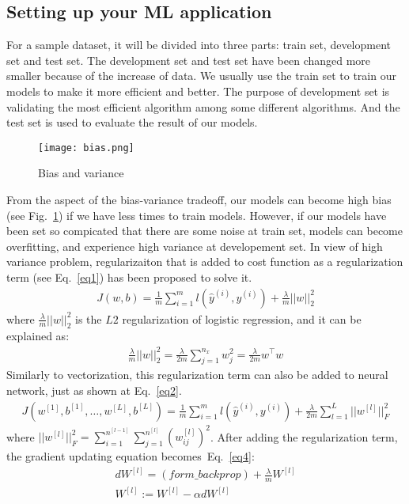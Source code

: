 \documentclass[a4paper]{article}
\begin{document}
\subsection{Setting up your ML application}

For a sample dataset, it will be divided into three parts: train set, development set and test set. The development set and test set have been changed more smaller because of the increase of data. We usually use the train set to train our models to make it more efficient and better. The purpose of development set is validating the most efficient algorithm among some different algorithms. And the test set is used to evaluate the result of our models.

\begin{figure}[hb]
\begin{center}
\texttt{[image: bias.png]}
\end{center}
\caption{Bias and variance}
\label{fig1}
\end{figure}

From the aspect of the bias-variance tradeoff, our models can become high bias (see Fig.~\ref{fig1}) if we have less times to train models. However, if our models have been set so compicated that there are some noise at train set, models can become overfitting, and experience high variance at developement set. In view of high variance problem, regularizaiton that is added to cost function as a regularization term (see Eq.~\ref{eq1}) has been proposed to solve it. \\
\begin{gather}
J(w,b) = \frac{1}{m}\sum_{i=1}^{m}l(\hat{y}^{(i)},y^{(i)}) + \frac{\lambda}{m}||w||
_2^2
\label{eq1}
\end{gather}
where $\frac{\lambda}{m}||w||_2^2$ is the $L2$ regularization of logistic regression, and it can be explained as:\\
\begin{gather}
\frac{\lambda}{m}||w||_2^2 = \frac{\lambda}{2m}\sum_{j=1}^{n_x}w_j^2 = \frac{\lambda}{2m}w^{\top}w
\end{gather}
Similarly to vectorization, this regularization term can also be added to neural network, just as shown at Eq.~\ref{eq2}.\\
\begin{gather}
J(w^{[1]},b^{[1]},\dots,w^{[L]},b^{[L]}) = \frac{1}{m}\sum_{i=1}^ml(\hat{y}^{(i)},y^{(i)}) + \frac{\lambda}{2m}\sum_{l=1}^{L}||w^{[l]}||_F^2
\label{eq2}
\end{gather}
where $||w^{[l]}||_F^2 = \sum_{i=1}^{n^{[l-1]}}\sum_{j=1}^{n^[l]}(w_{ij}^{[l]})^2 $. After adding the regularization term, the gradient updating equation becomes~Eq.~\ref{eq4}:\\
\begin{gather}
dW^{[l]} = (form\_backprop) + \frac{\lambda}{m}W^{[l]}\\
W^{[l]} := W^{[l]} - \alpha dW^{[l]}
\label{eq4}
\end{gather}
\end{document}
